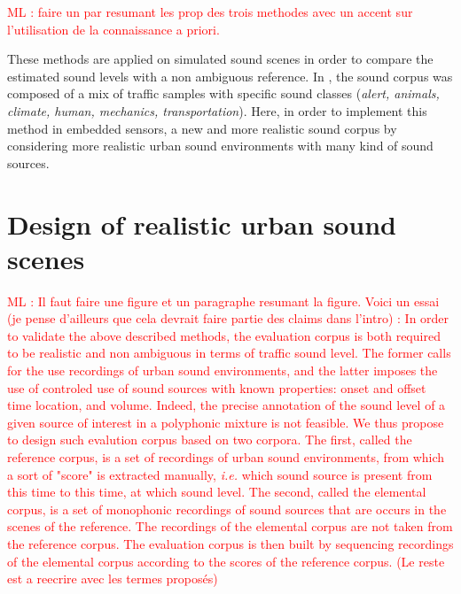 \documentclass[review,5p,twocolumn,sort&compress,times]{elsarticle}
\newcommand{\ml}[1]{\textcolor{red}{ML : #1}}
\begin{document}
\ml{faire un par resumant les prop des trois methodes avec un accent sur l'utilisation de la connaissance a priori.}

These methods are applied on simulated sound scenes in order to compare the estimated sound levels with a non ambiguous reference. In \cite{gloaguen2018Estimation}, the sound corpus was composed of a mix of traffic samples with specific sound classes (\textit{alert, animals, climate, human, mechanics, transportation}). Here, in order to implement this method in embedded sensors, a new and more realistic sound corpus by considering more realistic urban sound environments with many kind of sound sources.

\section{Design of realistic urban sound scenes}\label{part:urban_scene}

\ml{Il faut faire une figure et un paragraphe resumant la figure. Voici un essai (je pense d'ailleurs que cela devrait faire partie des claims dans l'intro) : In order to validate the above described methods, the evaluation corpus is both required to be realistic and non ambiguous in terms of traffic sound level. The former calls for the use recordings of urban sound environments, and the latter imposes the use of controled use of sound sources with known properties: onset and offset time location, and volume. Indeed, the precise annotation of the sound level of a given source of interest in a polyphonic mixture is not feasible. We thus propose to design such evalution corpus based on two corpora. The first, called the reference corpus, is a set of recordings of urban sound environments, from which a sort of "score" is extracted manually, \textit{i.e.} which sound source is present from this time to this time, at which sound level. The second, called the elemental corpus, is a set of monophonic recordings of sound sources that are occurs in the scenes of the reference. The recordings of the elemental corpus are not taken from the reference corpus. The evaluation corpus is then built by sequencing recordings of the elemental corpus according to the scores of the reference corpus. (Le reste est a reecrire avec les termes proposés)}
\end{document}
